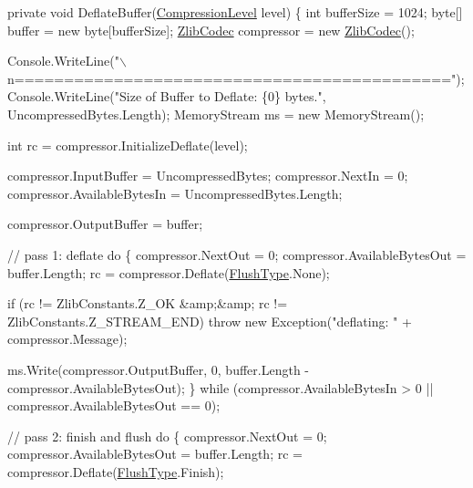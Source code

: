 \begin{DoxyCode}
\textcolor{keyword}{private} \textcolor{keywordtype}{void} DeflateBuffer(\mbox{\hyperlink{namespace_super_tiled2_unity_1_1_ionic_1_1_zlib_a20f6771804996c363f454ad9765cd7db}{CompressionLevel}} level)
\{
    \textcolor{keywordtype}{int} bufferSize = 1024;
    byte[] buffer = \textcolor{keyword}{new} byte[bufferSize];
    \mbox{\hyperlink{class_super_tiled2_unity_1_1_ionic_1_1_zlib_1_1_zlib_codec_afb741f3d8822709c3fe17ff284d537ab}{ZlibCodec}} compressor = \textcolor{keyword}{new} \mbox{\hyperlink{class_super_tiled2_unity_1_1_ionic_1_1_zlib_1_1_zlib_codec_afb741f3d8822709c3fe17ff284d537ab}{ZlibCodec}}();

    Console.WriteLine(\textcolor{stringliteral}{"\(\backslash\)n============================================"});
    Console.WriteLine(\textcolor{stringliteral}{"Size of Buffer to Deflate: \{0\} bytes."}, UncompressedBytes.Length);
    MemoryStream ms = \textcolor{keyword}{new} MemoryStream();

    \textcolor{keywordtype}{int} rc = compressor.InitializeDeflate(level);

    compressor.InputBuffer = UncompressedBytes;
    compressor.NextIn = 0;
    compressor.AvailableBytesIn = UncompressedBytes.Length;

    compressor.OutputBuffer = buffer;

    \textcolor{comment}{// pass 1: deflate }
    \textcolor{keywordflow}{do}
    \{
        compressor.NextOut = 0;
        compressor.AvailableBytesOut = buffer.Length;
        rc = compressor.Deflate(\mbox{\hyperlink{namespace_super_tiled2_unity_1_1_ionic_1_1_zlib_a2c5853fd63f03c83ac2458da1f4ff3bc}{FlushType}}.None);

        \textcolor{keywordflow}{if} (rc != ZlibConstants.Z\_OK &amp;&amp; rc != ZlibConstants.Z\_STREAM\_END)
            \textcolor{keywordflow}{throw} \textcolor{keyword}{new} Exception(\textcolor{stringliteral}{"deflating: "} + compressor.Message);

        ms.Write(compressor.OutputBuffer, 0, buffer.Length - compressor.AvailableBytesOut);
    \}
    \textcolor{keywordflow}{while} (compressor.AvailableBytesIn > 0 || compressor.AvailableBytesOut == 0);

    \textcolor{comment}{// pass 2: finish and flush}
    \textcolor{keywordflow}{do}
    \{
        compressor.NextOut = 0;
        compressor.AvailableBytesOut = buffer.Length;
        rc = compressor.Deflate(\mbox{\hyperlink{namespace_super_tiled2_unity_1_1_ionic_1_1_zlib_a2c5853fd63f03c83ac2458da1f4ff3bc}{FlushType}}.Finish);


\end{DoxyCode}
